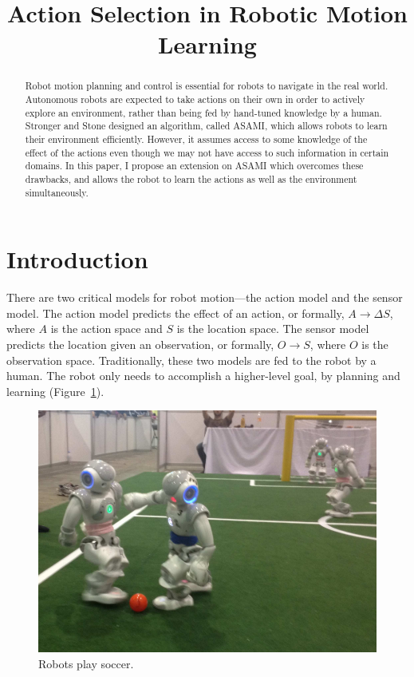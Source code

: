 \documentclass[12pt]{article}
\title{Action Selection in Robotic Motion Learning}
\date{}
\begin{document}
\maketitle

\begin{abstract}
Robot motion planning and control is essential for robots to navigate
in the real world.
Autonomous robots are expected to take actions on their own in order to actively explore an
environment, rather than being fed by hand-tuned knowledge by a human.
Stronger and Stone designed an algorithm, called ASAMI, which
allows robots to learn their environment efficiently. However, it
assumes access to some knowledge of the effect of the actions even
though we may not have access to such information in certain domains.
In this paper, I propose an extension on ASAMI which overcomes these
drawbacks, and allows the robot to learn the actions as well as the
environment simultaneously.
\end{abstract}

\section{Introduction}

There are two critical models for robot motion---the action model and
the sensor model. The action model predicts the effect of an action,
or formally, $A \rightarrow \Delta S$, where $A$ is the action space
and $S$ is the location space. The sensor model predicts the
location given an observation, or formally, $O \rightarrow S$, where
$O$ is the observation space. Traditionally, these two models are
fed to the robot by a human. The robot only needs to  accomplish a
higher-level goal, by planning and learning (Figure~\ref{fig:robocup}).

\begin{figure}
\centering
\includegraphics[width=0.7\columnwidth]{Robocup.png}
\caption{Robots play soccer. \cite{LNAI12-Barrett}}
\label{fig:robocup}
\end{figure}
\end{document}
